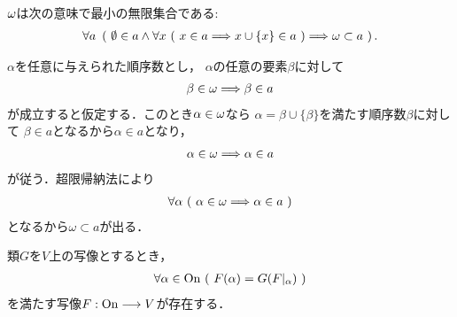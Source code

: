 	\begin{screen}
		\begin{thm}
		\label{thm:the_principle_of_mathematical_induction}
			${\bf \omega}$は次の意味で最小の無限集合である:
			\begin{align}
				\forall a\ \left(\ \emptyset \in a \wedge \forall x\ 
				(\ x \in a \Longrightarrow x \cup \{x\} \in a\ ) 
				\Longrightarrow {\bf \omega} \subset a\ \right).
			\end{align}
		\end{thm}
	\end{screen}
	
	\begin{prf}
		$\alpha$を任意に与えられた順序数とし，
		$\alpha$の任意の要素$\beta$に対して
		\begin{align}
			\beta \in {\bf \omega} \Longrightarrow \beta \in a
		\end{align}
		が成立すると仮定する．このとき$\alpha \in {\bf \omega}$なら
		$\alpha = \beta \cup \{\beta\}$を満たす順序数$\beta$に対して
		$\beta \in a$となるから$\alpha \in a$となり，
		\begin{align}
			\alpha \in {\bf \omega} \Longrightarrow \alpha \in a
		\end{align}
		が従う．超限帰納法により
		\begin{align}
			\forall \alpha\ (\ \alpha \in {\bf \omega} \Longrightarrow \alpha \in a\ )
		\end{align}
		となるから$\omega \subset a$が出る．
		\QED
	\end{prf}
	
	
	\begin{screen}
		\begin{thm}[超限帰納法による写像の構成]\label{thm:transfinite_recursion_theorem}
			類$G$を$V$上の写像とするとき，
			\begin{align}
				\forall \alpha \in \mathrm{On}\ (\ F(\alpha) = G(F|_\alpha)\ )
			\end{align}
			を満たす写像$F:\mathrm{On} \longrightarrow V$が存在する．
		\end{thm}
	\end{screen}
	
